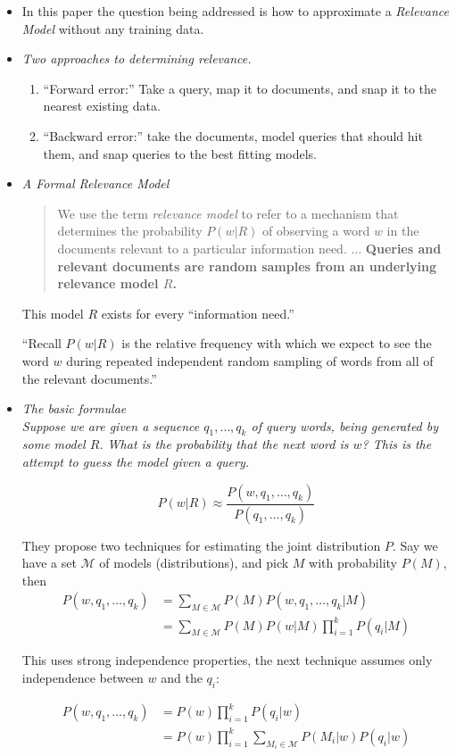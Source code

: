 \documentclass{article}
\newcommand{\note}[1]{{\footnotesize #1}}
\newcommand{\hii}[1]{{\it #1}}
\newcommand{\hiii}[1]{{\it #1}}
\newcommand{\M}{\mathcal{M}}
\begin{document}
\begin{itemize}

\item In this paper the question being addressed is how to approximate a \emph{Relevance Model} without any training data.

\item \hii{Two approaches to determining relevance.}
    \begin{enumerate}
        \item ``Forward error:''  Take a query, map it to documents, and snap it to the nearest existing data.
        \item ``Backward error:'' take the documents, model queries that should hit them, and snap queries to the best fitting models.
    \end{enumerate}

\item \hii{A Formal Relevance Model}
        \begin{quote}
            We use the term \emph{relevance model} to refer to a mechanism that determines the probability $P(w|R)$ of observing a word $w$ in the documents relevant to a particular information need. $\dots$ {\bf Queries and relevant documents are random samples from an underlying relevance model $R$.}
        \end{quote}

        \note{This model $R$ exists for every ``information need.''}

        \note{ ``Recall $P(w|R)$ is the relative frequency with which we expect to see the word $w$ during repeated independent random sampling of words from all of the relevant documents.''}

\item \hii{The basic formulae}\\
    \hiii{Suppose we are given a sequence $q_1, \dots, q_k$ of query words, being generated by some model $R$.  What is the probability that the next word is $w$?  This is the attempt to guess the model given a query.}

    \[ P(w|R) \approx \frac{P(w,q_1,\dots,q_k)}{P(q_1,\dots,q_k)} \]
    
    They propose two techniques for estimating the joint distribution $P$.  Say we have a set $\M$ of models (distributions), and pick $M$ with probability $P(M)$, then
    \begin{align*}
        P(w,q_1,\dots,q_k) 
           & =  \sum_{M \in \M} P(M)P(w,q_1,\dots,q_k|M) \\
           & =  \sum_{M \in \M} P(M)P(w|M)\prod_{i=1}^k P(q_i|M)
    \end{align*}
    
    This uses strong independence properties, the next technique assumes only independence between $w$ and the $q_i$:

    \begin{align*}
        P(w,q_1,\dots,q_k) & = P(w)\prod_{i=1}^k P(q_i|w)  \\
              & = P(w)\prod_{i=1}^k \sum_{M_i \in \M} P(M_i|w)P(q_i|w)
    \end{align*}

\end{itemize}
\end{document}
